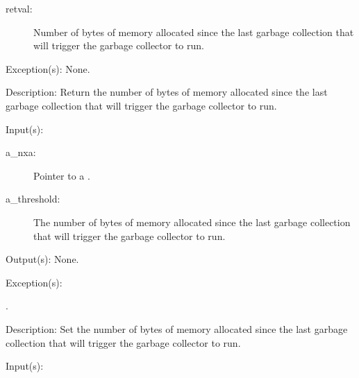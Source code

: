 \begin{capi}
\begin{capilist}
		\begin{description}\item[]
		\item[retval: ]
			Number of bytes of memory allocated since the last
			garbage collection that will trigger the garbage
			collector to run.
		\end{description}
	\item[Exception(s): ] None.
	\item[Description: ]
		Return the number of bytes of memory allocated since the last
		garbage collection that will trigger the garbage collector to
		run.
	\end{capilist}
\label{nxa_threshold_set}
	\begin{capilist}
	\item[Input(s): ]
		\begin{description}\item[]
		\item[a\_nxa: ]
			Pointer to a .
		\item[a\_threshold: ]
			The number of bytes of memory allocated since the last
			garbage collection that will trigger the garbage
			collector to run.
		\end{description}
	\item[Output(s): ] None.
	\item[Exception(s): ]
		\begin{description}\item[]
		\item[.]
		\end{description}
	\item[Description: ]
		Set the number of bytes of memory allocated since the last
		garbage collection that will trigger the garbage collector to
		run.
	\end{capilist}
\label{nxa_stats_get}
	\begin{capilist}
	\item[Input(s): ]
		\begin{description}\item[]

\end{description}
\end{capilist}
\end{capi}
